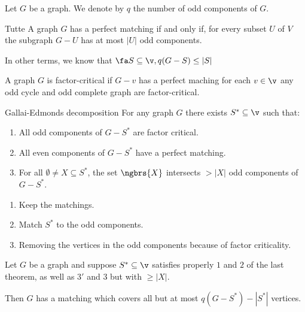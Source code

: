 Let $G$ be a graph. We denote by $\mathit{q}$ the number of odd components of $G$.
\begin{customtheorem}{Tutte}
\label{theorem:tutte}
    A graph $G$ has a perfect matching if and only if, for every subset $U$ of $V$ the subgraph $G - U$ has at most $|U|$ odd components.

    In other terms, we know that $\fa S \subseteq \v, q(G - S) \leq |S|$
\end{customtheorem}
A graph $G$ is factor-critical if $G - v$ has a perfect maching for each $v \in \v$ any odd cycle and odd complete graph are factor-critical.
\begin{customtheorem}{Gallai-Edmonds decomposition}
\label{theorem:gallai-edmonds}
    For any graph $G$ there exists $S^* \subseteq \v$ such that:
    \begin{enumerate}
        \item All odd components of $G - S^*$ are factor critical.
        \item All even components of $G - S^*$ have a perfect matching.
        \item For all $\emptyset \neq X \subseteq S^*$, the set $\ngbrs{X}$ intersects $> |X|$ odd components of $G - S^*$.
    \end{enumerate}
\end{customtheorem}
\begin{enumerate}
    \item Keep the matchings.
    \item Match $S^*$ to the odd components.
    \item Removing the vertices in the odd components because of factor criticality.
\end{enumerate}
\begin{customlemma}{2.8}
\label{lemma:2.8}
    Let $G$ be a graph and suppose $S^* \subseteq \v$ satisfies properly $1$ and $2$ of the last theorem, as well as $3'$ and $3$ but with $\geq |X|$.

    Then $G$ has a matching which covers all but at most $\mathit{q}(G - S^*) - |S^*|$ vertices.
\end{customlemma}
